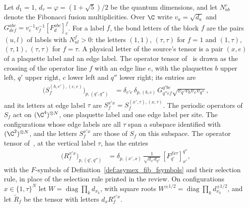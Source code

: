 \begin{definition}
    \label{def:asymex_fib_gsymbol_tensor}
    \leanok
    Let $d_1=1$, $d_\tau=\varphi=(1+\sqrt5)/2$ be the quantum dimensions,
    and let $N_{ab}^c$ denote the Fibonacci fusion multiplicities.
    Over $\C$ write $v_a=\sqrt{d_a}$ and $G^{abc}_{def}=v_e^{-1}v_f^{-1}[F^{abc}_d]_e^f$.
    For a label $f$, the bond letters of the block $f$ are the pairs
    $(u,l)$ of labels with $N_{ul}^f>0$: the letters $(1,1)$, $(\tau,\tau)$
    for $f=1$ and $(1,\tau)$, $(\tau,1)$, $(\tau,\tau)$ for $f=\tau$. A
    physical letter of the source's tensor is a pair $(x,e)$ of a plaquette
    label and an edge label. The operator tensor
    of~\cite[Section~6.2 and Appendix~D.1]{Bultinck2017Anyons} is drawn as the
    crossing of the
    operator line $f$ with an edge line $e$, with the plaquettes $b$ upper
    left, $q'$ upper right, $c$ lower left and $q''$ lower right; its
    entries are
    \begin{align}
        \bigl(S_f^{(b,e'),(c,e)}\bigr)_{p,(q',q'')}
         & =\delta_{e'e}\,\delta_{p,(b,c)}\,
        G^{q'bc}_{q''ef}\sqrt{v_{q'}v_bv_cv_{q''}},
        \label{eq:asymex_fib_gsymbol_tensor}
    \end{align}
    and its letters at edge label $\tau$ are
    $S_f^{x'x}=S_f^{(x',\tau),(x,\tau)}$. The periodic operators of $S_f$
    act on $(\C^4)^{\otimes N}$, one plaquette label and one edge label
    per site. The configurations whose edge labels are all $\tau$ span a
    subspace identified with $(\C^2)^{\otimes N}$, and the letters $S_f^{x'x}$ are
    those of $S_f$ on this subspace. The operator tensor
    of~\cite[Appendix~A, ``The MPO for the Fibonacci model'']{Cirac2021Matrix},
    at the vertical label $\tau$, has the entries
    \begin{align}
        \bigl(R_f^{x'x}\bigr)_{p,(q',q'')}
         & =\delta_{p,(x',x)}\,\frac{1}{\sqrt{d_{x'}d_{q''}}}\,
        [F^{f x\tau}_{q'}]_{x'}^{q''},
        \label{eq:asymex_fib_review_tensor}
    \end{align}
    with the $F$-symbols of Definition~\ref{def:asymex_fib_fsymbols} and their
    selection rule, in place of the selection rule printed in the review.
    On configurations $x\in\{1,\tau\}^N$ let
    $W=\operatorname{diag}\prod_k d_{x_k}$, with square roots
    $W^{\pm1/2}=\operatorname{diag}\prod_k d_{x_k}^{\pm1/2}$, and let $\widetilde R_f$ be
    the tensor with letters $d_x R_f^{x'x}$.
\end{definition}

